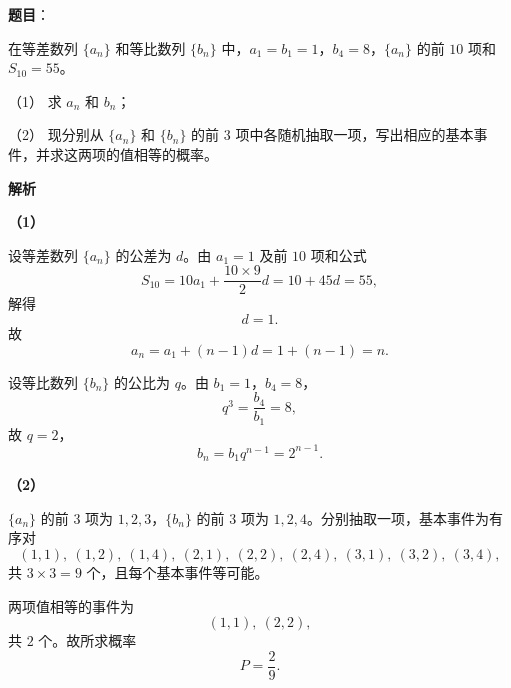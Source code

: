\begin{answer}

\textbf{题目}：

在等差数列 $\{a_n\}$ 和等比数列 $\{b_n\}$ 中，$a_1=b_1=1$，$b_4=8$，$\{a_n\}$ 的前 $10$ 项和 $S_{10}=55$。

（1） 求 $a_n$ 和 $b_n$；

（2） 现分别从 $\{a_n\}$ 和 $\{b_n\}$ 的前 $3$ 项中各随机抽取一项，写出相应的基本事件，并求这两项的值相等的概率。

\textbf{解析}

\textbf{（1）}

设等差数列 $\{a_n\}$ 的公差为 $d$。由 $a_1=1$ 及前 $10$ 项和公式
\nopagebreak[4]
\[S_{10}=10a_1+\frac{10\times9}{2}d=10+45d=55,\]
解得
\nopagebreak[4]
\[d=1.\]
故
\nopagebreak[4]
\[a_n=a_1+(n-1)d=1+(n-1)=n.\]

设等比数列 $\{b_n\}$ 的公比为 $q$。由 $b_1=1$，$b_4=8$，
\nopagebreak[4]
\[q^3=\frac{b_4}{b_1}=8,\]
故 $q=2$，
\nopagebreak[4]
\[b_n=b_1q^{n-1}=2^{n-1}.\]

\textbf{（2）}

$\{a_n\}$ 的前 $3$ 项为 $1,2,3$，$\{b_n\}$ 的前 $3$ 项为 $1,2,4$。分别抽取一项，基本事件为有序对
\nopagebreak[4]
\[(1,1),\ (1,2),\ (1,4),\ (2,1),\ (2,2),\ (2,4),\ (3,1),\ (3,2),\ (3,4),\]
共 $3\times3=9$ 个，且每个基本事件等可能。

两项值相等的事件为
\nopagebreak[4]
\[(1,1),\ (2,2),\]
共 $2$ 个。故所求概率
\nopagebreak[4]
\[P=\frac29.\]



\end{answer}
